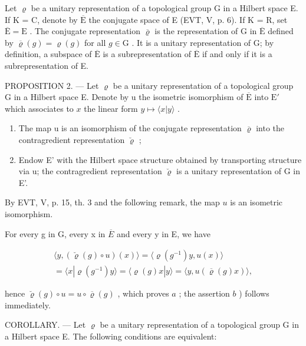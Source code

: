Let \(\varrho\) be a unitary representation of a topological group G in a Hilbert space E. If K = C, denote by \(\overline{\mathrm{E}}\) the conjugate space of E (EVT, V, p. 6). If K = R, set \(\overline{\mathrm{E}} = \mathrm{E}\) . The conjugate representation \(\overline{\varrho}\) is the representation of G in \(\overline{\mathrm{E}}\) defined by \(\overline{\varrho}(g) = \varrho(g)\) for all \(g \in \mathrm{G}\) . It is a unitary representation of G; by definition, a subspace of \(\overline{\mathrm{E}}\) is a subrepresentation of \(\overline{\mathrm{E}}\) if and only if it is a subrepresentation of E.

PROPOSITION 2. --- Let \(\varrho\) be a unitary representation of a topological group G in a Hilbert space E. Denote by u the isometric isomorphism of \(\overline{\mathrm{E}}\) into \(\mathrm{E}'\) which associates to \(x\) the linear form \(y\mapsto \langle x|y\rangle\) .

\begin{enumerate}
\def\labelenumi{\alph{enumi})}
\item
  The map u is an isomorphism of the conjugate representation \(\overline{\varrho}\) into the contragredient representation \(\breve{\varrho}\) ;
\item
  Endow E' with the Hilbert space structure obtained by transporting structure via u; the contragredient representation \(\breve{\varrho}\) is a unitary representation of G in E'.
\end{enumerate}

By EVT, V, p. 15, th. 3 and the following remark, the map \(u\) is an isometric isomorphism.

For every g in G, every x in \(\overline{E}\) and every y in E, we have

\[
\begin{array}{c} \langle y, (\breve {\varrho} (g) \circ u) (x) \rangle = \langle \varrho (g ^ {- 1}) y, u (x) \rangle \\ = \langle x | \varrho (g ^ {- 1}) y \rangle = \langle \varrho (g) x | y \rangle = \langle y, u (\overline {{\varrho}} (g) x) \rangle , \end{array}
\]

hence \(\breve{\varrho}(g) \circ u = u \circ \overline{\varrho}(g)\) , which proves \(a\) ; the assertion \(b\) ) follows immediately.

COROLLARY. --- Let \(\varrho\) be a unitary representation of a topological group G in a Hilbert space E. The following conditions are equivalent:


